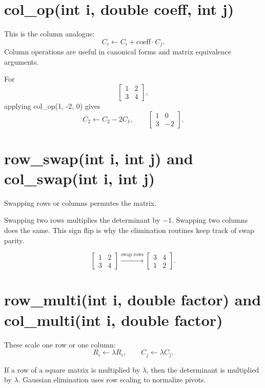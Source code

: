 \documentclass[11pt,a4paper,openany]{book}
\def\code#1{#1}%
\DeclareRobustCommand{\code}[1]{\texttt{\detokenize{#1}}}
\begin{document}
\section{\code{col_op(int i, double coeff, int j)}}
This is the column analogue:
\[
C_i \leftarrow C_i + \text{coeff} \cdot C_j.
\]
Column operations are useful in canonical forms and matrix equivalence arguments.

\begin{examplebox}[Example]
For
\[
\begin{bmatrix}
1 & 2 \\
3 & 4
\end{bmatrix},
\]
applying \code{col_op(1, -2, 0)} gives
\[
C_2 \leftarrow C_2 - 2C_1,
\qquad
\begin{bmatrix}
1 & 0 \\
3 & -2
\end{bmatrix}.
\]
\end{examplebox}

\section{\code{row_swap(int i, int j)} and \code{col_swap(int i, int j)}}
Swapping rows or columns permutes the matrix.

\begin{mathbox}
Swapping two rows multiplies the determinant by \(-1\). Swapping two columns does the same. This sign flip is why the elimination routines keep track of swap parity.
\end{mathbox}

\begin{examplebox}[Example]
\[
\begin{bmatrix}
1 & 2 \\
3 & 4
\end{bmatrix}
\xrightarrow{\text{swap rows}}
\begin{bmatrix}
3 & 4 \\
1 & 2
\end{bmatrix}.
\]
\end{examplebox}

\section{\code{row_multi(int i, double factor)} and \code{col_multi(int i, double factor)}}
These scale one row or one column:
\[
R_i \leftarrow \lambda R_i,
\qquad
C_j \leftarrow \lambda C_j.
\]

\begin{mathbox}
If a row of a square matrix is multiplied by \(\lambda\), then the determinant is multiplied by \(\lambda\). Gaussian elimination uses row scaling to normalize pivots.
\end{mathbox}
\end{document}

